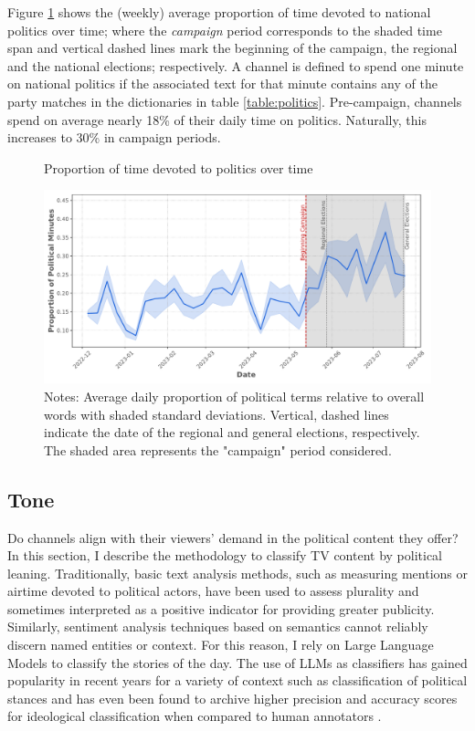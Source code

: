 \documentclass[12pt]{article}
\begin{document}
	Figure \ref{fig:coverage} shows the (weekly) average proportion of time devoted to national politics over time; where the \textit{campaign} period corresponds to the shaded time span and vertical dashed lines mark the beginning of the campaign, the regional and the national elections; respectively.  A channel is defined to spend one minute on national politics if the associated text for that minute contains any of the party matches in the dictionaries in table \ref{table:politics}. Pre-campaign, channels spend on average nearly 18\% of their daily time on politics. Naturally, this increases to 30\% in campaign periods. 
	
	\begin{figure}[h!]
		\caption{Proportion of time devoted to politics over time}
		\centering
		\includegraphics[width=120mm]{figures/political_words2}
		\caption*{\small Notes: Average daily proportion of political terms relative to overall words with shaded standard deviations. Vertical, dashed lines indicate the date of the regional and general elections, respectively. The shaded area represents the "campaign" period considered.}
		\label{fig:coverage}
	\end{figure}
	
	
	
	
	\subsection{ Tone}
	
	
	Do channels align with their viewers' demand in the political content they offer? In this section, I describe the methodology to classify TV content by political leaning. Traditionally, basic text analysis methods, such as measuring mentions or airtime devoted to political actors, have been used to assess plurality and sometimes interpreted as a positive indicator for providing greater publicity. Similarly, sentiment analysis techniques based on semantics cannot reliably discern named entities or context. For this reason, I rely on Large Language Models to classify the stories of the day. The use of LLMs as classifiers has gained popularity in recent years for a variety of context such as classification of political stances \citep{lemens} and has even been found to archive higher precision and accuracy scores for ideological classification when compared to human annotators \citep{tornberg2023}.
	
\end{document}
